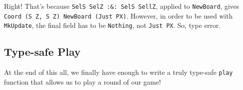 \documentclass[]{article}
\newenvironment{Shaded}{}{}
\newcommand{\DataTypeTok}[1]{\textcolor[rgb]{0.56,0.13,0.00}{#1}}
\newcommand{\KeywordTok}[1]{\textcolor[rgb]{0.00,0.44,0.13}{\textbf{#1}}}
\newcommand{\NormalTok}[1]{#1}
\newcommand{\OperatorTok}[1]{\textcolor[rgb]{0.40,0.40,0.40}{#1}}
\newcommand{\OtherTok}[1]{\textcolor[rgb]{0.00,0.44,0.13}{#1}}
\begin{document}
\begin{Shaded}
\end{Shaded}

Right! That's because \texttt{SelS\ SelZ\ :\&:\ SelS\ SellZ}, applied to
\texttt{NewBoard}, gives
\texttt{Coord\ \textquotesingle{}(\textquotesingle{}S\ \textquotesingle{}Z,\ \textquotesingle{}S\ \textquotesingle{}Z)\ NewBoard\ (\textquotesingle{}Just\ \textquotesingle{}PX)}.
However, in order to be used with \texttt{MkUpdate}, the final field has to be
\texttt{\textquotesingle{}Nothing}, not
\texttt{\textquotesingle{}Just\ \textquotesingle{}PX}. So, type error.

\hypertarget{type-safe-play}{%
\subsection{Type-safe Play}\label{type-safe-play}}

At the end of this all, we finally have enough to write a truly type-safe
\texttt{play} function that allows us to play a round of our game!
\end{document}
